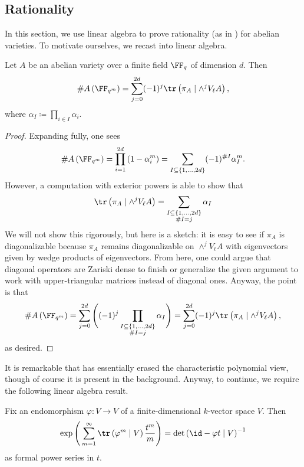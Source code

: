 \documentclass{amsart}
\begin{document}
\subsection{Rationality}
In this section, we use linear algebra to prove rationality (as in ) for abelian varieties. To motivate ourselves, we recast  into linear algebra.
\begin{lemma} \label{lem:count-points-by-trace}
	Let $A$ be an abelian variety over a finite field $\FF_q$ of dimension $d$. Then
	\[\#A\left(\FF_{q^m}\right)=\sum_{j=0}^{2d}(-1)^j\tr\left(\pi_A\mid\wedge^jV_\ell A\right),\]
	where $\alpha_I\coloneqq\prod_{i\in I}\alpha_i$.
\end{lemma}
\begin{proof}
	Expanding  fully, one sees
	\[\#A\left(\FF_{q^m}\right)=\prod_{i=1}^{2d}\left(1-\alpha_i^m\right)=\sum_{\substack{I\subseteq\{1,\ldots,2d\}}}(-1)^{\#I}\alpha_I^m.\]
	However, a computation with exterior powers is able to show that
	\[\tr\left(\pi_A\mid\land^jV_\ell A\right)=\sum_{\substack{I\subseteq\{1,\ldots,2d\}\\\#I=j}}\alpha_I\]
	We will not show this rigorously, but here is a sketch: it is easy to see if $\pi_A$ is diagonalizable because $\pi_A$ remains diagonalizable on $\land^jV_\ell A$ with eigenvectors given by wedge products of eigenvectors. From here, one could argue that diagonal operators are Zariski dense to finish or generalize the given argument to work with upper-triangular matrices instead of diagonal ones. Anyway, the point is that
	\[\#A\left(\FF_{q^m}\right)=\sum_{j=0}^{2d}\Bigg((-1)^j\prod_{\substack{I\subseteq\{1,\ldots,2d\}\\\#I=j}}\alpha_I\Bigg)=\sum_{j=0}^{2d}(-1)^j\tr\left(\pi_A\mid\land^jV_\ell A\right),\]
	as desired.
\end{proof}
It is remarkable that  has essentially erased the characteristic polynomial view, though of course it is present in the background. Anyway, to continue, we require the following linear algebra result.
\begin{lemma} \label{lem:remove-exp-zeta}
	Fix an endomorphism $\varphi\colon V\to V$ of a finite-dimensional $k$-vector space $V$. Then
	\[\exp\Bigg(\sum_{m=1}^\infty\tr\left(\varphi^m\mid V\right)\frac{t^m}m\Bigg)=\det\left({\id}-\varphi t\mid V\right)^{-1}\]
	as formal power series in $t$.
\end{lemma}
\end{document}
